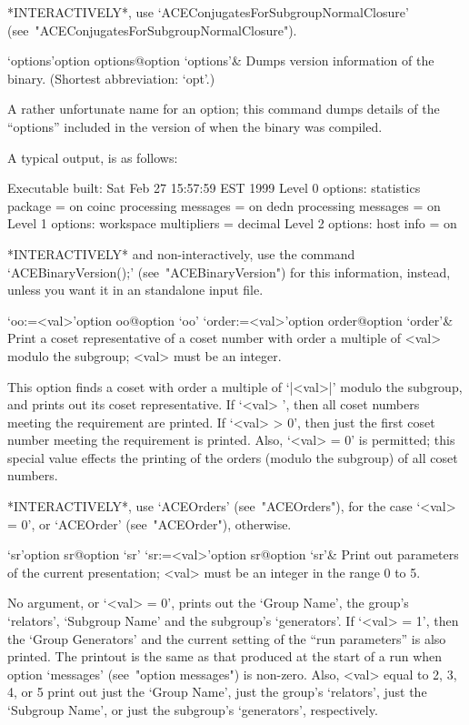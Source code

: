 *INTERACTIVELY*,      use      `ACEConjugatesForSubgroupNormalClosure'
(see~"ACEConjugatesForSubgroupNormalClosure").

\>`options'{option options}@{option `options'}&
Dumps version information of the {\ACE} binary.
(Shortest abbreviation: `opt'.)

A rather unfortunate name for an option; this command dumps details of
the ``options'' included in the version  of  {\ACE}  when  the  {\ACE}
binary was compiled.

A typical output, is as follows:

\begintt
Executable built:
  Sat Feb 27 15:57:59 EST 1999
Level 0 options:
  statistics package = on
  coinc processing messages = on
  dedn processing messages = on
Level 1 options:
  workspace multipliers = decimal
Level 2 options:
  host info = on
\endtt

*INTERACTIVELY*    and    non-interactively,    use    the     command
`ACEBinaryVersion();' (see~"ACEBinaryVersion") for  this  information,
instead, unless you want it in an {\ACE} standalone input file.

\>`oo:=<val>'{option oo}@{option `oo'}
\>`order:=<val>'{option order}@{option `order'}&
Print a coset representative of a coset number with order  a  multiple
of <val> modulo the subgroup; <val> must be an integer.

This option finds a coset with order a multiple  of  `|<val>|'  modulo
the subgroup, and prints out its coset representative.  If  `<val>  ', then all coset numbers meeting the  requirement  are  printed.  If
`<val> > 0', then just the first coset number meeting the  requirement
is printed. Also, `<val> = 0' is permitted; this special value effects
the printing of the orders (modulo the subgroup) of all coset numbers.

*INTERACTIVELY*,  use  `ACEOrders'  (see~"ACEOrders"),  for  the  case
`<val> = 0', or `ACEOrder' (see~"ACEOrder"), otherwise.

\>`sr'{option sr}@{option `sr'}
\>`sr:=<val>'{option sr}@{option `sr'}&
Print out parameters of the current presentation;  <val>  must  be  an
integer in the range 0 to 5.

No argument, or `<val> = 0', prints out the `Group Name', the  group's
`relators', `Subgroup Name' and the subgroup's `generators'. If `<val>
= 1', then the `Group Generators' and the current setting of the ``run
parameters'' is also  printed.  The  printout  is  the  same  as  that
produced at the start of a run  when  option  `messages'  (see~"option
messages") is non-zero. Also, <val> equal to 2, 3, 4, or 5  print  out
just the `Group Name', just the group's `relators', just the `Subgroup
Name', or just the subgroup's `generators', respectively.

